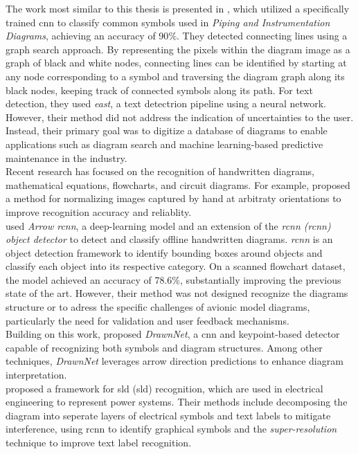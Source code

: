 The work most similar to this thesis is presented in \cite{mani_haddad_constantini_douhard_li_poirier_2020}, which utilized a specifically trained \acrlong{cnn} to classify common symbols used in \textit{Piping and Instrumentation Diagrams}, achieving an accuracy of 90$\%$. They detected connecting lines using a graph search approach. By representing the pixels within the diagram image as a graph of black and white nodes, connecting lines can be identified by starting at any node corresponding to a symbol and traversing the diagram graph along its black nodes, keeping track of connected symbols along its path. For text detection, they used \textit{\acrshort{east}}, a text detectrion pipeline using a neural network. However, their method did not address the indication of uncertainties to the user. Instead, their primary goal was to digitize a database of diagrams to enable applications such as diagram search and machine learning-based predictive maintenance in the industry.\\
Recent research has focused on the recognition of handwritten diagrams, mathematical equations, flowcharts, and circuit diagrams. For example, \cite{wei_phung_bouzerdoum_bermak_2015} proposed a method for normalizing images captured by hand at arbitraty orientations to improve recognition accuracy and reliablity.\\
\cite{schaefer_keuper_stuckenschmidt_2021} used \textit{Arrow \acrshort{rcnn}}, a deep-learning model and an extension of the \textit{\acrlong{rcnn} (\acrshort{rcnn}) object detector} \cite{zhang2023dive} to detect and classify offline handwritten diagrams. \textit{\acrshort{rcnn}} is an object detection framework to identify bounding boxes around objects and classify each object into its respective category. On a scanned flowchart dataset, the model achieved an accuracy of 78.6$\%$, substantially improving the previous state of the art. However, their method was not designed recognize the diagrams structure or to adress the specific challenges of avionic model diagrams, particularly the need for validation and user feedback mechanisms.\\
Building on this work, \cite{fang_feng_cai_2022} proposed \textit{DrawnNet}, a \acrshort{cnn} and keypoint-based detector capable  of recognizing both symbols and diagram structures. Among other techniques, \textit{DrawnNet} leverages arrow direction predictions to enhance diagram interpretation.\\
\cite{yang_wang_zhang_li_wang_yang_shi_2024} proposed a framework for \acrlong{sld} (\acrshort{sld}) recognition, which are used in electrical engineering to represent power systems. Their methods include decomposing the diagram into seperate layers of electrical symbols and text labels to mitigate interference, using \acrshort{rcnn} to identify graphical symbols and the \textit{super-resolution} technique to improve text label recognition.

